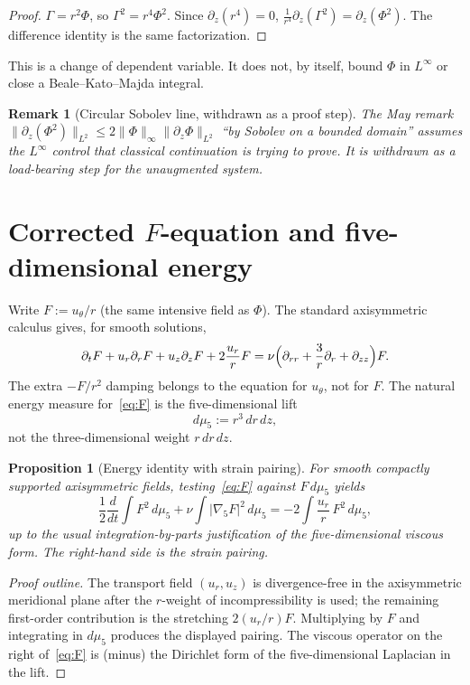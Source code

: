 \documentclass[11pt]{article}
\newtheorem{proposition}[theorem]{Proposition}
\newtheorem{remark}[theorem]{Remark}
\newcommand{\norm}[2]{\|#1\|_{#2}}
\begin{document}
\begin{proof}
\(\Gamma=r^2\Phi\), so \(\Gamma^2=r^4\Phi^2\). Since \(\partial_z(r^4)=0\),
\(\frac1{r^4}\partial_z(\Gamma^2)=\partial_z(\Phi^2)\).
The difference identity is the same factorization.
\end{proof}

This is a change of dependent variable. It does not, by itself, bound
\(\Phi\) in \(L^\infty\) or close a Beale--Kato--Majda integral.

\begin{remark}[Circular Sobolev line, withdrawn as a proof step]
The May remark \(\norm{\partial_z(\Phi^2)}{L^2}\le 2\norm{\Phi}{\infty}\norm{\partial_z\Phi}{L^2}\)
``by Sobolev on a bounded domain'' assumes the \(L^\infty\) control that
classical continuation is trying to prove. It is withdrawn as a load-bearing step
for the unaugmented system.
\end{remark}

\section{Corrected \(F\)-equation and five-dimensional energy}

Write \(F:=u_\theta/r\) (the same intensive field as \(\Phi\)).
The standard axisymmetric calculus gives, for smooth solutions,
\begin{equation}\label{eq:F}
\partial_t F+u_r\partial_r F+u_z\partial_z F+2\frac{u_r}{r}F
=\nu\Bigl(\partial_{rr}+\frac3r\partial_r+\partial_{zz}\Bigr)F.
\end{equation}
The extra \(-F/r^2\) damping belongs to the equation for \(u_\theta\), not for \(F\).
The natural energy measure for~\eqref{eq:F} is the five-dimensional lift
\[
  d\mu_5:= r^3\,dr\,dz,
\]
not the three-dimensional weight \(r\,dr\,dz\).

\begin{proposition}[Energy identity with strain pairing]
For smooth compactly supported axisymmetric fields, testing~\eqref{eq:F}
against \(F\,d\mu_5\) yields
\begin{equation}\label{eq:energy}
  \frac12\frac{d}{dt}\int F^2\,d\mu_5
  +\nu\int |\nabla_5 F|^2\,d\mu_5
  =-2\int \frac{u_r}{r}\,F^2\,d\mu_5,
\end{equation}
up to the usual integration-by-parts justification of the five-dimensional
viscous form. The right-hand side is the strain pairing.
\end{proposition}

\begin{proof}[Proof outline]
The transport field \((u_r,u_z)\) is divergence-free in the axisymmetric
meridional plane after the \(r\)-weight of incompressibility is used;
the remaining first-order contribution is the stretching
\(2(u_r/r)F\). Multiplying by \(F\) and integrating in \(d\mu_5\) produces
the displayed pairing. The viscous operator on the right of~\eqref{eq:F}
is (minus) the Dirichlet form of the five-dimensional Laplacian in the lift.
\end{proof}
\end{document}
